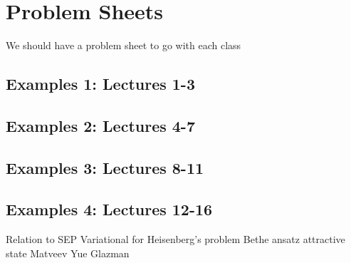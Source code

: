 \section{Problem Sheets}


We should have a problem sheet to go with each class

\subsection{Examples 1: Lectures 1-3}

\subsection{Examples 2: Lectures 4-7}

\subsection{Examples 3: Lectures 8-11}

\subsection{Examples 4: Lectures 12-16}




Relation to SEP
Variational for Heisenberg's problem
Bethe ansatz attractive state
Matveev Yue Glazman
